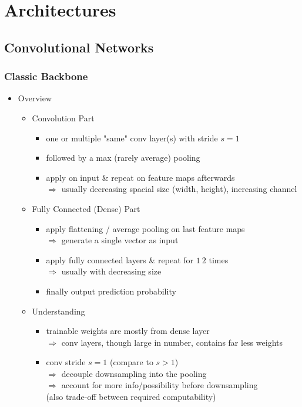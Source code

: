\section{Architectures}

\subsection{Convolutional Networks}
\subsubsection{Classic Backbone}
\begin{itemize}
\item Overview
	\begin{itemize}
	\item Convolution Part
		\begin{itemize}
		\item one or multiple "same" conv layer(s) with stride $s=1$
		\item followed by a max (rarely average) pooling
		\item apply on input \& repeat on feature maps afterwards \\
		$\Rightarrow$ usually decreasing spacial size (width, height), increasing channel
		\end{itemize}
	\item Fully Connected (Dense) Part
		\begin{itemize}
		\item apply flattening / average pooling on last feature maps \\
		$\Rightarrow$ generate a single vector as input
		\item apply fully connected layers \& repeat for $1~2$ times \\
		$\Rightarrow$ usually with decreasing size
		\item finally output prediction probability
		\end{itemize}
	\item Understanding
		\begin{itemize}
		\item trainable weights are mostly from dense layer \\
		$\Rightarrow$ conv layers, though large in number, contains far less weights
		\item conv stride $s=1$ (compare to $s>1$) \\
		$\Rightarrow$ decouple downsampling into the pooling \\
		$\Rightarrow$ account for more info/possibility before downsampling \\
		(also trade-off between required computability)
		\end{itemize}
	\end{itemize}


\end{itemize}
